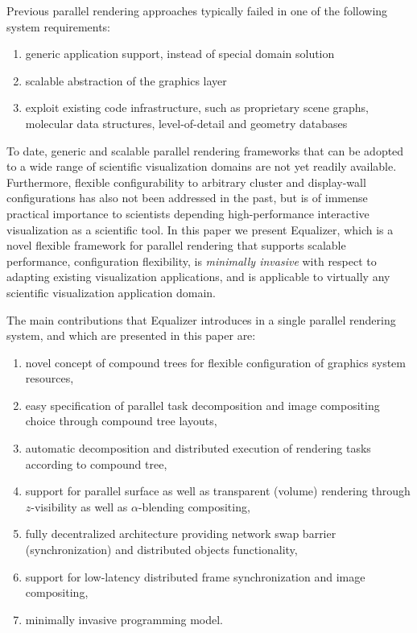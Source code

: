 \documentclass[journal]{vgtc}                %
\begin{document}
Previous parallel rendering approaches typically failed in one of the following system requirements:
%
\begin{enumerate}\renewcommand{\labelenumi}{\alph{enumi})}
\addtolength{\itemsep}{-0.5\baselineskip}
\item generic application support, instead of special domain solution
\item scalable abstraction of the graphics layer
\item exploit existing code infrastructure, such as proprietary scene graphs, molecular data structures, level-of-detail and geometry databases
\end{enumerate}

To date, generic and scalable parallel rendering frameworks  that can be adopted to a wide range of scientific visualization domains are not yet readily available. Furthermore, flexible
configurability to arbitrary cluster and display-wall configurations has also not been addressed in the past, but is of immense practical importance to scientists depending high-performance interactive visualization as a scientific tool. In this paper we present Equalizer, which is a novel flexible framework for parallel rendering that supports scalable performance, configuration flexibility, is {\em minimally invasive} with respect to adapting existing visualization applications, and is applicable to virtually any scientific visualization application domain.

The main contributions that Equalizer introduces in a single parallel rendering system, and which are presented in this paper are:
%
\begin{enumerate}\renewcommand{\labelenumi}{\roman{enumi})}
\addtolength{\itemsep}{-0.5\baselineskip}
\item novel concept of compound trees for flexible configuration of graphics system resources,
\item easy specification of parallel task decomposition and image compositing choice through compound tree layouts,
\item automatic decomposition and distributed execution of rendering tasks according to compound tree,
\item support for parallel surface as well as transparent (volume) rendering through $z$-visibility as well as $\alpha$-blending compositing,
\item fully decentralized architecture providing network swap barrier (synchronization) and distributed objects functionality,
\item support for low-latency distributed frame synchronization and image compositing,
\item minimally invasive programming model.
\end{enumerate}
\end{document}
